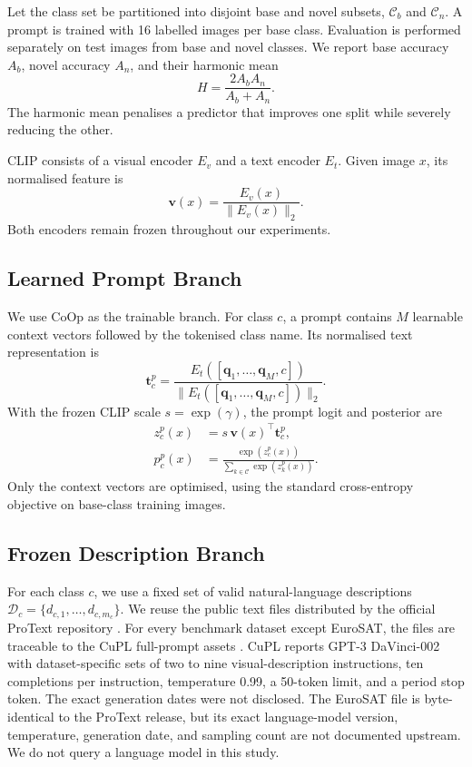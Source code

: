 \documentclass[preprint,12pt]{elsarticle}
\begin{document}
Let the class set be partitioned into disjoint base and novel subsets, $\mathcal{C}_{b}$ and $\mathcal{C}_{n}$. A prompt is trained with 16 labelled images per base class. Evaluation is performed separately on test images from base and novel classes. We report base accuracy $A_b$, novel accuracy $A_n$, and their harmonic mean
\begin{equation}
H = \frac{2A_bA_n}{A_b+A_n}.
\label{eq:hm}
\end{equation}
The harmonic mean penalises a predictor that improves one split while severely reducing the other.

CLIP consists of a visual encoder $E_v$ and a text encoder $E_t$. Given image $x$, its normalised feature is
\begin{equation}
\mathbf{v}(x)=\frac{E_v(x)}{\|E_v(x)\|_2}.
\end{equation}
Both encoders remain frozen throughout our experiments.

\subsection{Learned Prompt Branch}

We use CoOp as the trainable branch. For class $c$, a prompt contains $M$ learnable context vectors followed by the tokenised class name. Its normalised text representation is
\begin{equation}
\mathbf{t}^{p}_{c}=\frac{E_t([\mathbf{q}_1,\ldots,\mathbf{q}_M,c])}
{\|E_t([\mathbf{q}_1,\ldots,\mathbf{q}_M,c])\|_2}.
\end{equation}
With the frozen CLIP scale $s=\exp(\gamma)$, the prompt logit and posterior are
\begin{align}
z^{p}_{c}(x) &= s\,\mathbf{v}(x)^{\top}\mathbf{t}^{p}_{c},\\
p^{p}_{c}(x) &= \frac{\exp(z^{p}_{c}(x))}{\sum_{k\in\mathcal{C}}\exp(z^{p}_{k}(x))}.
\end{align}
Only the context vectors are optimised, using the standard cross-entropy objective on base-class training images.

\subsection{Frozen Description Branch}

For each class $c$, we use a fixed set of valid natural-language descriptions $\mathcal{D}_c=\{d_{c,1},\ldots,d_{c,m_c}\}$. We reuse the public text files distributed by the official ProText repository \cite{khattak2025protext}. For every benchmark dataset except EuroSAT, the files are traceable to the CuPL full-prompt assets \cite{pratt2023cupl}. CuPL reports GPT-3 DaVinci-002 with dataset-specific sets of two to nine visual-description instructions, ten completions per instruction, temperature 0.99, a 50-token limit, and a period stop token. The exact generation dates were not disclosed. The EuroSAT file is byte-identical to the ProText release, but its exact language-model version, temperature, generation date, and sampling count are not documented upstream. We do not query a language model in this study.
\end{document}
